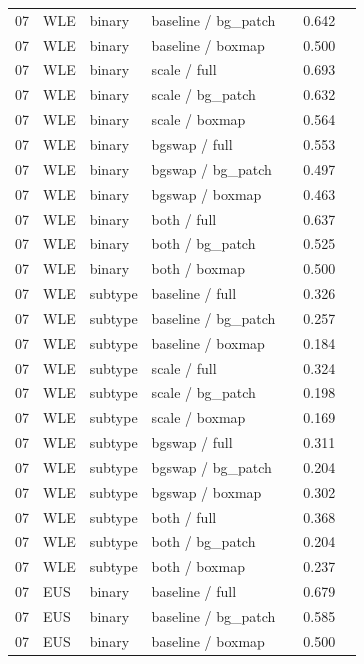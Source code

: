 \begin{longtable}{cL{1.1cm}L{1.5cm}L{5.6cm}ccc}
07 & WLE & binary & baseline / bg\_patch & \nl{} & 0.642 & \nl{} \\
07 & WLE & binary & baseline / boxmap & \nl{} & 0.500 & \nl{} \\
07 & WLE & binary & scale / full & \nl{} & 0.693 & \nl{} \\
07 & WLE & binary & scale / bg\_patch & \nl{} & 0.632 & \nl{} \\
07 & WLE & binary & scale / boxmap & \nl{} & 0.564 & \nl{} \\
07 & WLE & binary & bgswap / full & \nl{} & 0.553 & \nl{} \\
07 & WLE & binary & bgswap / bg\_patch & \nl{} & 0.497 & \nl{} \\
07 & WLE & binary & bgswap / boxmap & \nl{} & 0.463 & \nl{} \\
07 & WLE & binary & both / full & \nl{} & 0.637 & \nl{} \\
07 & WLE & binary & both / bg\_patch & \nl{} & 0.525 & \nl{} \\
07 & WLE & binary & both / boxmap & \nl{} & 0.500 & \nl{} \\
07 & WLE & subtype & baseline / full & \nl{} & 0.326 & \nl{} \\
07 & WLE & subtype & baseline / bg\_patch & \nl{} & 0.257 & \nl{} \\
07 & WLE & subtype & baseline / boxmap & \nl{} & 0.184 & \nl{} \\
07 & WLE & subtype & scale / full & \nl{} & 0.324 & \nl{} \\
07 & WLE & subtype & scale / bg\_patch & \nl{} & 0.198 & \nl{} \\
07 & WLE & subtype & scale / boxmap & \nl{} & 0.169 & \nl{} \\
07 & WLE & subtype & bgswap / full & \nl{} & 0.311 & \nl{} \\
07 & WLE & subtype & bgswap / bg\_patch & \nl{} & 0.204 & \nl{} \\
07 & WLE & subtype & bgswap / boxmap & \nl{} & 0.302 & \nl{} \\
07 & WLE & subtype & both / full & \nl{} & 0.368 & \nl{} \\
07 & WLE & subtype & both / bg\_patch & \nl{} & 0.204 & \nl{} \\
07 & WLE & subtype & both / boxmap & \nl{} & 0.237 & \nl{} \\
07 & EUS & binary & baseline / full & \nl{} & 0.679 & \nl{} \\
07 & EUS & binary & baseline / bg\_patch & \nl{} & 0.585 & \nl{} \\
07 & EUS & binary & baseline / boxmap & \nl{} & 0.500 & \nl{} \\

\end{longtable}

